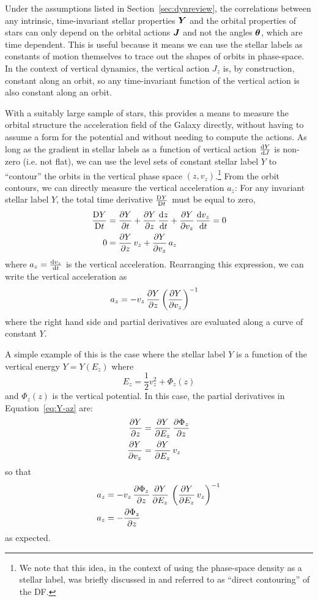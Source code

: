 Under the assumptions listed in Section~\ref{sec:dynreview}, the correlations between
any intrinsic, time-invariant stellar properties $\boldsymbol{Y}$ and the orbital properties of
stars can only depend on the orbital actions $\boldsymbol{J}$ and not the angles $\boldsymbol{\theta}$,
which are time dependent.
This is useful because it means we can use the stellar labels as constants of motion
themselves to trace out the shapes of orbits in phase-space.
In the context of vertical dynamics, the vertical action $J_z$ is, by construction,
constant along an orbit, so any time-invariant function of the vertical action is also
constant along an orbit.

With a suitably large sample of stars, this provides a means to measure the orbital
structure the acceleration field of the Galaxy directly, without having to assume a form
for the potential and without needing to compute the actions.
As long as the gradient in stellar labels as a function of vertical action
$\frac{\mathrm{d}{Y}}{\mathrm{d}{J}}$ is non-zero (i.e. not flat), we can use the level sets of constant
stellar label $Y$ to ``contour'' the orbits in the vertical phase space $(z,
v_z)$.\footnote{We note that this idea, in the context of using the phase-space density
as a stellar label, was briefly discussed in \citet{Kuijken:19XX} and referred to as
``direct contouring'' of the DF.}
From the orbit contours, we can directly measure the vertical acceleration $a_z$: For
any invariant stellar label $Y$, the total time derivative $\frac{\mathrm{D}{Y}}{\mathrm{D}{t}}$ must be equal
to zero,
\begin{align}
    \frac{\mathrm{D}{Y}}{\mathrm{D}{t}} &= \frac{\partial {Y}}{\partial {t}} +
        \frac{\partial {Y}}{\partial {z}} \, \frac{\mathrm{d}{z}}{\mathrm{d}{t}} + \frac{\partial {Y}}{\partial {v_z}} \, \frac{\mathrm{d}{v_z}}{\mathrm{d}{t}} = 0 \\
    0 &= \frac{\partial {Y}}{\partial {z}} \, v_z + \frac{\partial {Y}}{\partial {v_z}} \, a_z
\end{align}
where $a_z = \frac{\mathrm{d}{v_z}}{\mathrm{d}{t}}$ is the vertical acceleration.
Rearranging this expression, we can write the vertical acceleration as
\begin{align}
    a_z &= - v_z \, \frac{\partial {Y}}{\partial {z}} \left(\frac{\partial {Y}}{\partial {v_z}}\right)^{-1} \label{eq:Y-az}
\end{align}
where the right hand side and partial derivatives are evaluated along a curve of
constant $Y$.

A simple example of this is the case where the stellar label $Y$ is a function of the
vertical energy $Y=Y(E_z)$ where
\begin{equation}
    E_z = \frac{1}{2} v_z^2 + \Phi_z(z)
\end{equation}
and $\Phi_z(z)$ is the vertical potential.
In this case, the partial derivatives in Equation~\ref{eq:Y-az} are:
\begin{align}
    \frac{\partial {Y}}{\partial {z}} &= \frac{\partial {Y}}{\partial {E_z}} \, \frac{\partial {\Phi_z}}{\partial {z}}\\
    \frac{\partial {Y}}{\partial {v_z}} &= \frac{\partial {Y}}{\partial {E_z}} \, v_z
\end{align}
so that
\begin{align}
    a_z &= - v_z \, \frac{\partial {\Phi_z}}{\partial {z}} \, \frac{\partial {Y}}{\partial {E_z}} \, \left(\frac{\partial {Y}}{\partial {E_z}} \, v_z\right)^{-1} \\
    a_z &= - \frac{\partial {\Phi_z}}{\partial {z}}
\end{align}
as expected.

